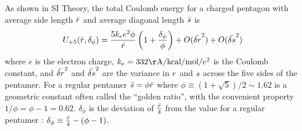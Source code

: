 \documentclass[journal=jacsat,manuscript=article]{achemso}
\begin{document}
As shown in SI Theory, the total Coulomb energy for a charged pentagon with average side length $\bar{r}$ and average diagonal length $\bar{s} $ is 
\begin{eqnarray}
U_{+5}(\bar{r}, \delta_{\phi}) = \frac{ 5 k_{e} e^{2}\phi}{\bar{r}}\left( 1+ \frac{\delta_{\phi}}{\phi} \right) + O(\bar{\delta r}^{2})+ O(\bar{\delta s}^{2})
 \label{eq:pentamer}
\end{eqnarray} 
where $e$ is the electron charge, $k_{e} = 332 \mathrm{\AA/kcal/mol}/e^{2}$ is the Coulomb constant, and $\bar{\delta r}^{2}$ and $\bar{\delta s}^{2}$ are the variance in $r$ and $s$ across the five sides of the pentamer.  For a regular pentamer $\bar{s} = \phi\bar{r}$ where $\phi \equiv \left(1 + \sqrt{5}\right)/2\sim 1.62$ is a geometric constant often called the ``golden ratio'', with the convenient property $1/\phi = \phi - 1=0.62$.  
$\delta_{\phi}$ is the deviation of $\frac{\bar{r}}{\bar{s}}$ from the value for a regular pentamer :  $ {\delta_{\phi}}\equiv \frac{\bar{r}}{\bar{s}} -(\phi - 1)$.
\end{document}
